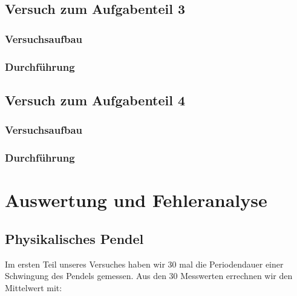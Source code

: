 \documentclass[11pt,a4paper]{article}
\begin{document}
       
       
       
       
       
       
       
       
       
       
       
       
       
       
       
       

\subsection{Versuch zum Aufgabenteil 3}
      \subsubsection{Versuchsaufbau}
      \subsubsection{Durchführung}

\subsection{Versuch zum Aufgabenteil 4}
     \subsubsection{Versuchsaufbau}
     \subsubsection{Durchführung}
     
     
     
     
     
     
     
     
     
\section{Auswertung und Fehleranalyse}
	\subsection{Physikalisches Pendel}
	
	Im ersten Teil unseres Versuches haben wir 30 mal die Periodendauer einer Schwingung des Pendels
	gemessen. Aus den 30 Messwerten errechnen wir den Mittelwert mit:
	
\end{document}
